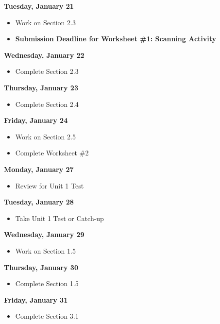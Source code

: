 \documentclass[11pt]{article}
\begin{document}
\textbf{Tuesday, January 21}

\begin{itemize}
\item Work on Section 2.3
\item \textbf{Submission Deadline for Worksheet \#1: Scanning Activity}
\end{itemize}

\textbf{Wednesday, January 22}

\begin{itemize}
\item Complete Section 2.3
\end{itemize}

\textbf{Thursday, January 23}

\begin{itemize}
\item Complete Section 2.4
\end{itemize}

\textbf{Friday, January 24}

\begin{itemize}
\item Work on Section 2.5
\item Complete Worksheet \#2
\end{itemize}

\textbf{Monday, January 27}

\begin{itemize}
\item Review for Unit 1 Test
\end{itemize}

\textbf{Tuesday, January 28}

\begin{itemize}
\item Take Unit 1 Test or Catch-up
\end{itemize}

\textbf{Wednesday, January 29}

\begin{itemize}
\item Work on Section 1.5
\end{itemize}

\textbf{Thursday, January 30}

\begin{itemize}
\item Complete Section 1.5
\end{itemize}

\textbf{Friday, January 31}

\begin{itemize}
\item Complete Section 3.1
\end{itemize}
\end{document}
